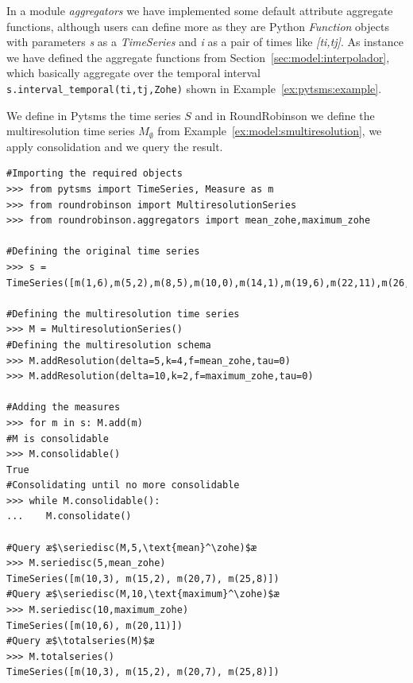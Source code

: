 In a module \emph{aggregators} we have implemented some default
attribute aggregate functions, although users can define more as they
are Python \emph{Function} objects with parameters \emph{s} as a
\emph{TimeSeries} and \emph{i} as a pair of times like
\emph{[ti,tj]}. As instance we have defined the \zohe{} aggregate
functions from Section~\ref{sec:model:interpolador}, which basically
aggregate over the temporal interval
\lstinline[style=py]+s.interval_temporal(ti,tj,Zohe)+ shown in
Example~\ref{ex:pytsms:example}.


\begin{example}
  We define in Pytsms the time series $S$ and in RoundRobinson we
  define the multiresolution time series $M_\emptyset$ from
  Example~\ref{ex:model:smultiresolution}, we apply consolidation and
  we query the result.

\begin{lstlisting}[style=py]
#Importing the required objects
>>> from pytsms import TimeSeries, Measure as m
>>> from roundrobinson import MultiresolutionSeries
>>> from roundrobinson.aggregators import mean_zohe,maximum_zohe

#Defining the original time series
>>> s = TimeSeries([m(1,6),m(5,2),m(8,5),m(10,0),m(14,1),m(19,6),m(22,11),m(26,6),m(29,0)])

#Defining the multiresolution time series
>>> M = MultiresolutionSeries()
#Defining the multiresolution schema
>>> M.addResolution(delta=5,k=4,f=mean_zohe,tau=0)
>>> M.addResolution(delta=10,k=2,f=maximum_zohe,tau=0)

#Adding the measures
>>> for m in s: M.add(m)
#M is consolidable
>>> M.consolidable()
True
#Consolidating until no more consolidable
>>> while M.consolidable():
...    M.consolidate()

#Query æ$\seriedisc(M,5,\text{mean}^\zohe)$æ
>>> M.seriedisc(5,mean_zohe)
TimeSeries([m(10,3), m(15,2), m(20,7), m(25,8)])
#Query æ$\seriedisc(M,10,\text{maximum}^\zohe)$æ
>>> M.seriedisc(10,maximum_zohe)
TimeSeries([m(10,6), m(20,11)])
#Query æ$\totalseries(M)$æ
>>> M.totalseries()
TimeSeries([m(10,3), m(15,2), m(20,7), m(25,8)])
\end{lstlisting}
\end{example}





